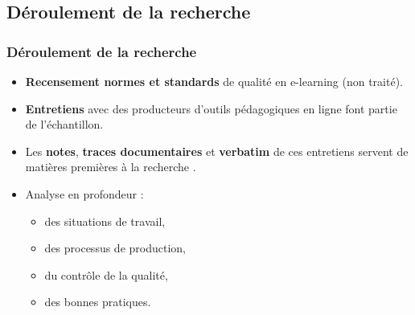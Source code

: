                        	\subsection{Déroulement de la recherche} 
					\begin{frame}[allowframebreaks]
						\frametitle{Déroulement de la recherche}
                        
                        			\begin{itemize} 
                       				 \item \textbf{Recensement normes et standards} de qualité en e-learning (non traité).
                       				 \item \textbf{Entretiens} avec des producteurs d’outils pédagogiques en ligne font partie de l’échantillon.
                       				 \item Les \textbf{notes}, \textbf{traces documentaires} et \textbf{verbatim} de ces entretiens servent de matières premières à la recherche .
                       				 \item Analyse en profondeur :
                       				 \begin{itemize} 
                       				 	\item des situations de travail, 
                       				 	\item des processus de production,
                       				 	\item du contrôle de la qualité,
                       				 	\item des bonnes pratiques.
                       				 \end{itemize}
                       		 \end{itemize}

             
                \end{frame}
